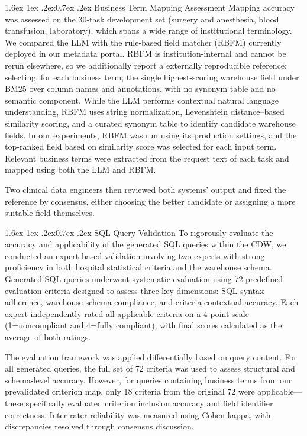 \documentclass[10pt]{article}
\makeatletter
\renewcommand\subsubsection{\@startsection{subsubsection}{3}{\z@}%
  {1.6ex \@plus 1ex \@minus .2ex}{0.7ex \@plus .2ex}%
  {\normalfont\normalsize\itshape}}
\makeatother
\begin{document}
\subsubsection{Business Term Mapping Assessment}
Mapping accuracy was assessed on the 30-task development set (surgery and anesthesia, blood transfusion, laboratory), which spans a wide range of institutional terminology. We compared the LLM with the rule-based field matcher (RBFM) currently deployed in our metadata portal. RBFM is institution-internal and cannot be rerun elsewhere, so we additionally report a externally reproducible reference: selecting, for each business term, the single highest-scoring warehouse field under BM25 over column names and annotations, with no synonym table and no semantic component. While the LLM
performs contextual natural language understanding, RBFM uses string
normalization, Levenshtein distance--based similarity scoring, and a curated
synonym table to identify candidate warehouse fields. In our experiments, RBFM
was run using its production settings, and the top-ranked field based on
similarity score was selected for each input term. Relevant business terms were
extracted from the request text of each task and mapped using both the LLM and
RBFM.

Two clinical data engineers then reviewed both systems' output and fixed the reference by consensus, either choosing the better candidate or assigning a more suitable field themselves.

\subsubsection{SQL Query Validation}
To rigorously evaluate the accuracy and applicability of the generated SQL
queries within the CDW, we conducted an expert-based validation involving two
experts with strong proficiency in both hospital statistical criteria and the
warehouse schema. Generated SQL queries underwent systematic evaluation using 72
predefined evaluation criteria designed to assess three key dimensions: SQL
syntax adherence, warehouse schema compliance, and criteria contextual accuracy.
Each expert independently rated all applicable criteria on a 4-point scale
(1=noncompliant and 4=fully compliant), with final scores calculated as the
average of both ratings.

The evaluation framework was applied differentially based on query content. For
all generated queries, the full set of 72 criteria was used to assess structural
and schema-level accuracy. However, for queries containing business terms from
our prevalidated criterion map, only 18 criteria from the original 72 were
applicable---these specifically evaluated criterion inclusion accuracy and field
identifier correctness. Inter-rater reliability was measured using Cohen kappa,
with discrepancies resolved through consensus discussion.
\end{document}
